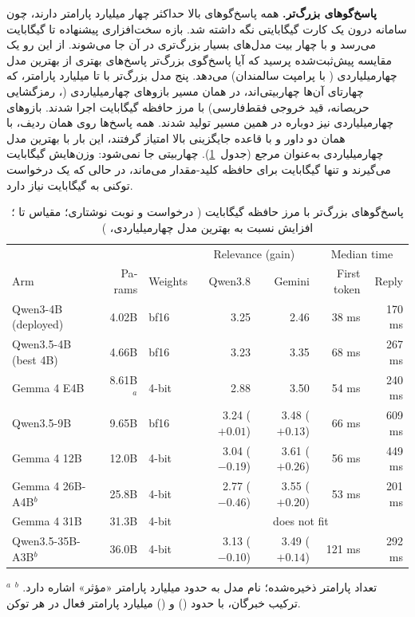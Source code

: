 \textbf{پاسخ‌گوهای بزرگ‌تر.} همه پاسخ‌گوهای بالا حداکثر چهار میلیارد پارامتر دارند،
چون سامانه درون یک کارت  گیگابایتی نگه داشته شد. بازه سخت‌افزاری پیشنهاده تا
 گیگابایت می‌رسد و با چهار بیت مدل‌های بسیار بزرگ‌تری در آن جا می‌شوند. از
این رو یک مقایسه پیش‌ثبت‌شده پرسید که آیا پاسخ‌گوی بزرگ‌تر پاسخ‌های بهتری از بهترین
مدل چهارمیلیاردی ( با پرامپت سالمندان) می‌دهد. پنج مدل بزرگ‌تر با
 تا  میلیارد پارامتر، که چهارتای آن‌ها چهاربیتی‌اند، در همان مسیر
بازوهای چهارمیلیاردی (، رمزگشایی حریصانه، قید خروجی فقط‌فارسی) با مرز
حافظه  گیگابایت اجرا شدند. بازوهای چهارمیلیاردی نیز دوباره در همین مسیر
تولید شدند. همه پاسخ‌ها روی همان  ردیف، با همان دو داور و با قاعده جایگزینی
بالا امتیاز گرفتند، این بار با بهترین مدل چهارمیلیاردی به‌عنوان مرجع
(جدول~\ref{tab:resp-size}).  چهاربیتی جا نمی‌شود: وزن‌هایش
 گیگابایت می‌گیرند و تنها  گیگابایت برای حافظه کلید-مقدار می‌ماند،
در حالی که یک درخواست  توکنی به  گیگابایت نیاز دارد.

\begin{table}[ht]
\centering
\caption{پاسخ‌گوهای بزرگ‌تر با مرز حافظه  گیگابایت ( درخواست و نوبت
         نوشتاری؛ مقیاس  تا ؛ افزایش نسبت به بهترین مدل چهارمیلیاردی،
         )}
\label{tab:resp-size}
\small
\setlength{\tabcolsep}{4pt}
\begin{latin}
\begin{tabular}{lrlrrrr}
\toprule
 & & & \multicolumn{2}{c}{Relevance (gain)} & \multicolumn{2}{c}{Median time} \\
Arm & Params & Weights & Qwen3.8 & Gemini & First token & Reply \\
\midrule
Qwen3-4B (deployed) & 4.02B & bf16 & 3.25 & 2.46 & 38 ms & 170 ms \\
Qwen3.5-4B (best 4B) & 4.66B & bf16 & 3.23 & 3.35 & 68 ms & 267 ms \\
Gemma 4 E4B & 8.61B$^{a}$ & 4-bit & 2.88 & 3.50 & 54 ms & 240 ms \\
Qwen3.5-9B & 9.65B & bf16 & 3.24 ($+0.01$) & 3.48 ($+0.13$) & 66 ms & 609 ms \\
Gemma 4 12B & 12.0B & 4-bit & 3.04 ($-0.19$) & 3.61 ($+0.26$) & 56 ms & 449 ms \\
Gemma 4 26B-A4B$^{b}$ & 25.8B & 4-bit & 2.77 ($-0.46$) & 3.55 ($+0.20$) & 53 ms & 201 ms \\
Gemma 4 31B & 31.3B & 4-bit & \multicolumn{4}{c}{does not fit} \\
Qwen3.5-35B-A3B$^{b}$ & 36.0B & 4-bit & 3.13 ($-0.10$) & 3.49 ($+0.14$) & 121 ms & 292 ms \\
\bottomrule
\end{tabular}
\end{latin}
\par\smallskip\footnotesize
$^{a}$ تعداد پارامتر ذخیره‌شده؛ نام مدل به حدود  میلیارد پارامتر «مؤثر» اشاره دارد.
$^{b}$ ترکیب خبرگان، با حدود  () و  () میلیارد پارامتر
فعال در هر توکن.
\end{table}

